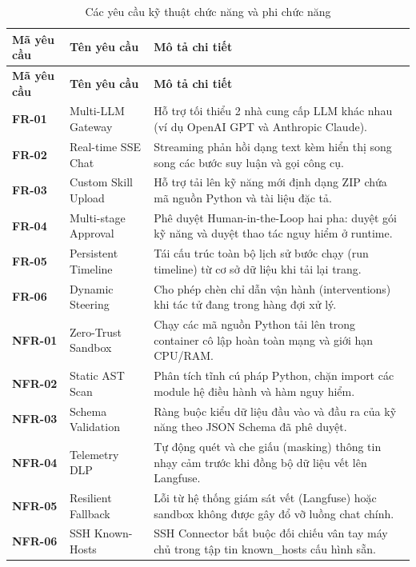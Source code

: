 \documentclass[12pt,a4paper]{article}
\begin{document}
\begin{longtable}{p{}p{}p{}}
\caption{Các yêu cầu kỹ thuật chức năng và phi chức năng}\label{tab:requirements}\\
\toprule
\textbf{Mã yêu cầu} & \textbf{Tên yêu cầu} & \textbf{Mô tả chi tiết} \\
\midrule
\endfirsthead
\toprule
\textbf{Mã yêu cầu} & \textbf{Tên yêu cầu} & \textbf{Mô tả chi tiết} \\
\midrule
\endhead
\textbf{FR-01} & Multi-LLM Gateway & Hỗ trợ tối thiểu 2 nhà cung cấp LLM khác nhau (ví dụ OpenAI GPT và Anthropic Claude). \\
\textbf{FR-02} & Real-time SSE Chat & Streaming phản hồi dạng text kèm hiển thị song song các bước suy luận và gọi công cụ. \\
\textbf{FR-03} & Custom Skill Upload & Hỗ trợ tải lên kỹ năng mới định dạng ZIP chứa mã nguồn Python và tài liệu đặc tả. \\
\textbf{FR-04} & Multi-stage Approval & Phê duyệt Human-in-the-Loop hai pha: duyệt gói kỹ năng và duyệt thao tác nguy hiểm ở runtime. \\
\textbf{FR-05} & Persistent Timeline & Tái cấu trúc toàn bộ lịch sử bước chạy (run timeline) từ cơ sở dữ liệu khi tải lại trang. \\
\textbf{FR-06} & Dynamic Steering & Cho phép chèn chỉ dẫn vận hành (interventions) khi tác tử đang trong hàng đợi xử lý. \\
\midrule
\textbf{NFR-01} & Zero-Trust Sandbox & Chạy các mã nguồn Python tải lên trong container cô lập hoàn toàn mạng và giới hạn CPU/RAM. \\
\textbf{NFR-02} & Static AST Scan & Phân tích tĩnh cú pháp Python, chặn import các module hệ điều hành và hàm nguy hiểm. \\
\textbf{NFR-03} & Schema Validation & Ràng buộc kiểu dữ liệu đầu vào và đầu ra của kỹ năng theo JSON Schema đã phê duyệt. \\
\textbf{NFR-04} & Telemetry DLP & Tự động quét và che giấu (masking) thông tin nhạy cảm trước khi đồng bộ dữ liệu vết lên Langfuse. \\
\textbf{NFR-05} & Resilient Fallback & Lỗi từ hệ thống giám sát vết (Langfuse) hoặc sandbox không được gây đổ vỡ luồng chat chính. \\
\textbf{NFR-06} & SSH Known-Hosts & SSH Connector bắt buộc đối chiếu vân tay máy chủ trong tập tin known\_hosts cấu hình sẵn. \\
\bottomrule
\end{longtable}
\end{document}
